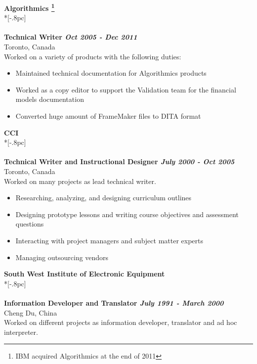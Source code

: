 \documentclass[11pt]{extarticle}
\begin{document}
{\large \bf Algorithmics \footnote {IBM acquired Algorithmics at the end of 2011}} \\*[-.8pc]
\underline{\hspace{6.55in}} \\
\\
{\bf Technical Writer \hfill \it Oct 2005 - Dec 2011\/} \\
Toronto, Canada\\
Worked on a variety of products with the following duties:
\begin{itemize}
\setlength{\itemsep}{0pt}
  \item Maintained technical documentation for Algorithmics products
  \item Worked as a copy editor to support the Validation team for the financial models documentation
  \item Converted huge amount of FrameMaker files to DITA format \\
\end{itemize}
{\large \bf CCI } \\*[-.8pc]
\underline{\hspace{6.55in}} \\
\\
{\bf Technical Writer and Instructional Designer \hfill \it July 2000 - Oct 2005} \\
Toronto, Canada \\
 Worked on many projects as lead technical writer.
\begin {itemize}
\setlength{\itemsep}{0pt}
\item Researching, analyzing, and designing curriculum outlines
\item Designing prototype lessons and writing course objectives and assessment questions
\item Interacting with project managers and subject matter experts
\item Managing outsourcing vendors \\
\end{itemize}
{\large \bf South West Institute of Electronic Equipment } \\*[-.8pc]
\underline{\hspace{6.55in}} \\
\\
{\bf Information Developer and Translator \hfill \it July 1991 - March 2000\/} \\
Cheng Du, China \\
 Worked on different projects as information developer, translator and ad hoc interpreter. 
\end{document}
